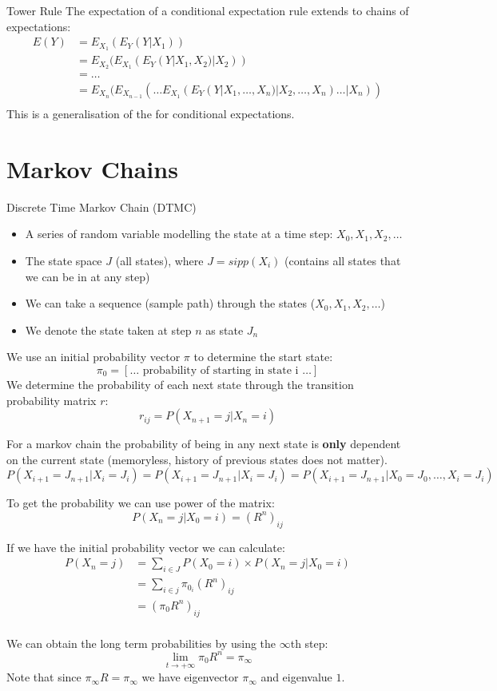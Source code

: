 \begin{definitionbox}{Tower Rule}
	The expectation of a conditional expectation rule extends to chains of expectations:
	\[\begin{split}
			E(Y) & = E_{X_1}(E_Y(Y | X_1)) \\
			& = E_{X_2}(E_{X_1}(E_Y(Y | X_1, X_2) | X_2)) \\
			& = \dots \\
			& = E_{X_n}(E_{X_{n-1}} ( \dots E_{X_1}(E_Y(Y | X_1 , \dots, X_n)| X_2 , \dots, X_n) \dots | X_n)) \\
		\end{split}\]
	This is a generalisation of the  for conditional expectations.
\end{definitionbox}


\section{Markov Chains}
\begin{definitionbox}{Discrete Time Markov Chain (DTMC)}
\begin{itemize}
	\item A series of random variable modelling the state at a time step: $X_0, X_1, X_2, \dots$
	\item The state space $J$ (all states), where $J = sipp(X_i)$ (contains all states that we can be in at any step)
	\item We can take a sequence (sample path) through the states ($X_0, X_1, X_2, \dots$)
	\item We denote the state taken at step $n$ as state $J_n$
\end{itemize}

We use an initial probability vector $\pi$ to determine the start state:
\[\pi_0 = [\dots \text{ probability of starting in state i } \dots ]\]
We determine the probability of each next state through the transition probability matrix $r$:
\[r_{ij} = P(X_{n+1} = j | X_n = i)\]

For a markov chain the probability of being in any next state is \textbf{only} dependent on the current state (memoryless, history of previous states does not matter).
\[P(X_{i+1} = J_{n+1} | X_i = J_i) = P(X_{i+1} = J_{n+1} | X_i = J_i) = P(X_{i+1} = J_{n+1} | X_0 = J_0, \dots, X_i = J_i)\]

To get the probability we can use power of the matrix:
\[P(X_n = j | X_0 = i) = (R^n)_{ij}\]

If we have the initial probability vector we can calculate:
\[\begin{split}
		P(X_n = j) &= \sum_{i \in J}P(X_0 = i) \times P(X_n = j | X_0 = i) \\
		& = \sum_{i \in j}\pi_{0_i}(R^n)_{ij} \\
		&= (\pi_0R^n)_{ij} \\
	\end{split}\]

We can obtain the long term probabilities by using the $\infty$th step:
\[\lim_{t \to +\infty} \pi_0R^n = \pi_{\infty}\]
Note that since $\pi_{\infty}R = \pi_{\infty}$ we have eigenvector $\pi_{\infty}$ and eigenvalue $1$.
\end{definitionbox}

